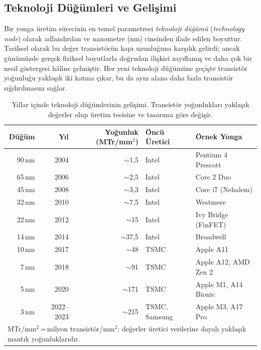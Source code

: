 \subsection{Teknoloji Düğümleri ve Gelişimi}
\label{sec:teknoloji-dugumleri}

Bir yonga üretim sürecinin en temel parametresi \emph{teknoloji düğümü} (\emph{technology node}) olarak adlandırılan ve nanometre (nm) cinsinden ifade edilen boyuttur. Tarihsel olarak bu değer transistörün kapı uzunluğuna karşılık gelirdi; ancak günümüzde gerçek fiziksel boyutlarla doğrudan ilişkisi zayıflamış ve daha çok bir nesil göstergesi hâline gelmiştir. Her yeni teknoloji düğümüne geçişte transistör yoğunluğu yaklaşık iki katına çıkar, bu da aynı alana daha fazla transistör sığdırılmasını sağlar.

\begin{table}[ht!]
\centering
\caption[Teknoloji düğümlerinin gelişimi]{Yıllar içinde teknoloji düğümlerinin gelişimi. Transistör yoğunlukları yaklaşık değerler olup üretim tesisine ve tasarıma göre değişir.}
\label{tab:teknoloji-dugumleri}
\footnotesize
\begin{tabular}{rrrll}
\toprule
\textbf{Düğüm} & \textbf{Yıl} & \textbf{Yoğunluk (MTr/mm$^2$)} & \textbf{Öncü Üretici} & \textbf{Örnek Yonga} \\
\midrule
90\,nm   & 2004 & ${\sim}$1{,}5  & Intel     & Pentium 4 Prescott \\
65\,nm   & 2006 & ${\sim}$2{,}5  & Intel     & Core 2 Duo \\
45\,nm   & 2008 & ${\sim}$3{,}3  & Intel     & Core i7 (Nehalem) \\
32\,nm   & 2010 & ${\sim}$7{,}5  & Intel     & Westmere \\
22\,nm   & 2012 & ${\sim}$15   & Intel     & Ivy Bridge (FinFET) \\
14\,nm   & 2014 & ${\sim}$37{,}5 & Intel     & Broadwell \\
10\,nm   & 2017 & ${\sim}$48   & TSMC      & Apple A11 \\
7\,nm    & 2018 & ${\sim}$91   & TSMC      & Apple A12, AMD Zen 2 \\
5\,nm    & 2020 & ${\sim}$171  & TSMC      & Apple M1, A14 Bionic \\
3\,nm    & 2022--2023 & ${\sim}$215 & TSMC, Samsung & Apple M3, A17 Pro \\
\bottomrule
\multicolumn{5}{l}{\scriptsize MTr/mm$^2$\,=\,milyon transistör/mm$^2$; değerler üretici verilerine dayalı yaklaşık mantık yoğunluklarıdır.}
\end{tabular}
\end{table}

